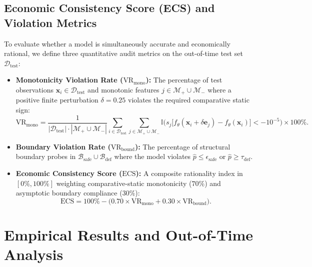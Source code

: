 \documentclass[11pt,a4paper]{article}
\begin{document}
\subsection{Economic Consistency Score (ECS) and Violation Metrics}
To evaluate whether a model is simultaneously accurate and economically rational, we define three quantitative audit metrics on the out-of-time test set $\mathcal{D}_{\text{test}}$:
\begin{itemize}
    \item \textbf{Monotonicity Violation Rate ($\text{VR}_{\text{mono}}$):} The percentage of test observations $\mathbf{x}_i \in \mathcal{D}_{\text{test}}$ and monotonic features $j \in \mathcal{M}_+ \cup \mathcal{M}_-$ where a positive finite perturbation $\delta = 0.25$ violates the required comparative static sign:
    \begin{equation}
        \text{VR}_{\text{mono}} = \frac{1}{|\mathcal{D}_{\text{test}}| \cdot |\mathcal{M}_+ \cup \mathcal{M}_-|} \sum_{i \in \mathcal{D}_{\text{test}}} \sum_{j \in \mathcal{M}_+ \cup \mathcal{M}_-} \mathbb{I}\Big( s_j \big[f_\theta(\mathbf{x}_i + \delta \mathbf{e}_j) - f_\theta(\mathbf{x}_i)\big] < -10^{-5} \Big) \times 100\%.
    \end{equation}
    \item \textbf{Boundary Violation Rate ($\text{VR}_{\text{bound}}$):} The percentage of structural boundary probes in $\mathcal{B}_{\text{safe}} \cup \mathcal{B}_{\text{def}}$ where the model violates $\hat{p} \le \epsilon_{\text{safe}}$ or $\hat{p} \ge \tau_{\text{def}}$.
    \item \textbf{Economic Consistency Score ($\text{ECS}$):} A composite rationality index in $[0\%, 100\%]$ weighting comparative-static monotonicity ($70\%$) and asymptotic boundary compliance ($30\%$):
    \begin{equation}
        \text{ECS} = 100\% - \Big( 0.70 \times \text{VR}_{\text{mono}} + 0.30 \times \text{VR}_{\text{bound}} \Big).
    \end{equation}
\end{itemize}

\section{Empirical Results and Out-of-Time Analysis}
\label{sec:experiments}
\end{document}
